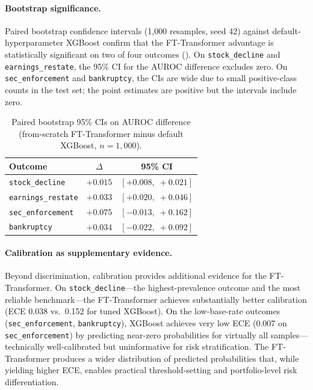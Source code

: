 \paragraph{Bootstrap significance.} Paired bootstrap confidence intervals (1{,}000 resamples, seed 42) against default-hyperparameter XGBoost confirm that the FT-Transformer advantage is statistically significant on two of four outcomes (). On \texttt{stock\_decline} and \texttt{earnings\_restate}, the 95\% CI for the AUROC difference excludes zero. On \texttt{sec\_enforcement} and \texttt{bankruptcy}, the CIs are wide due to small positive-class counts in the test set; the point estimates are positive but the intervals include zero.

\begin{table}[ht]
  \centering
  \caption{Paired bootstrap 95\% CIs on AUROC difference (from-scratch FT-Transformer minus default XGBoost, $n = 1{,}000$).}
  \label{tab:bootstrap}
  \small
  \begin{tabular}{@{}lcc@{}}
    \toprule
    Outcome & $\Delta$ & 95\% CI \\
    \midrule
    \texttt{stock\_decline} & $+0.015$ & $[+0.008,\;+0.021]$ \\
    \texttt{earnings\_restate} & $+0.033$ & $[+0.020,\;+0.046]$ \\
    \texttt{sec\_enforcement} & $+0.075$ & $[-0.013,\;+0.162]$ \\
    \texttt{bankruptcy} & $+0.034$ & $[-0.022,\;+0.092]$ \\
    \bottomrule
  \end{tabular}
\end{table}

\paragraph{Calibration as supplementary evidence.} Beyond discrimination, calibration provides additional evidence for the FT-Transformer. On \texttt{stock\_decline}---the highest-prevalence outcome and the most reliable benchmark---the FT-Transformer achieves substantially better calibration (ECE 0.038 vs.\ 0.152 for tuned XGBoost). On the low-base-rate outcomes (\texttt{sec\_enforcement}, \texttt{bankruptcy}), XGBoost achieves very low ECE (0.007 on \texttt{sec\_enforcement}) by predicting near-zero probabilities for virtually all samples---technically well-calibrated but uninformative for risk stratification. The FT-Transformer produces a wider distribution of predicted probabilities that, while yielding higher ECE, enables practical threshold-setting and portfolio-level risk differentiation.

